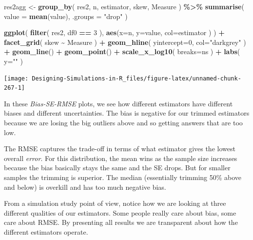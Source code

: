 \documentclass[
]{book}
\newenvironment{Shaded}{\begin{snugshade}}{\end{snugshade}}
\newcommand{\AttributeTok}[1]{\textcolor[rgb]{0.13,0.29,0.53}{#1}}
\newcommand{\DecValTok}[1]{\textcolor[rgb]{0.00,0.00,0.81}{#1}}
\newcommand{\FunctionTok}[1]{\textcolor[rgb]{0.13,0.29,0.53}{\textbf{#1}}}
\newcommand{\NormalTok}[1]{#1}
\newcommand{\OtherTok}[1]{\textcolor[rgb]{0.56,0.35,0.01}{#1}}
\newcommand{\SpecialCharTok}[1]{\textcolor[rgb]{0.81,0.36,0.00}{\textbf{#1}}}
\newcommand{\StringTok}[1]{\textcolor[rgb]{0.31,0.60,0.02}{#1}}
\begin{document}
\begin{Shaded}
\begin{Highlighting}[]
\NormalTok{res2agg }\OtherTok{\textless{}{-}} \FunctionTok{group\_by}\NormalTok{( res2, n, estimator, skew, Measure ) }\SpecialCharTok{\%\textgreater{}\%}
  \FunctionTok{summarise}\NormalTok{( }\AttributeTok{value =} \FunctionTok{mean}\NormalTok{(value), }\AttributeTok{.groups =} \StringTok{"drop"}\NormalTok{ )}

\FunctionTok{ggplot}\NormalTok{( }\FunctionTok{filter}\NormalTok{( res2, df0 }\SpecialCharTok{==} \DecValTok{3}\NormalTok{ ), }\FunctionTok{aes}\NormalTok{(}\AttributeTok{x=}\NormalTok{n, }\AttributeTok{y=}\NormalTok{value, }\AttributeTok{col=}\NormalTok{estimator ) ) }\SpecialCharTok{+}
    \FunctionTok{facet\_grid}\NormalTok{( skew }\SpecialCharTok{\textasciitilde{}}\NormalTok{ Measure ) }\SpecialCharTok{+}
    \FunctionTok{geom\_hline}\NormalTok{( }\AttributeTok{yintercept=}\DecValTok{0}\NormalTok{, }\AttributeTok{col=}\StringTok{"darkgrey"}\NormalTok{ ) }\SpecialCharTok{+}
    \FunctionTok{geom\_line}\NormalTok{() }\SpecialCharTok{+} \FunctionTok{geom\_point}\NormalTok{() }\SpecialCharTok{+}
    \FunctionTok{scale\_x\_log10}\NormalTok{( }\AttributeTok{breaks=}\NormalTok{ns ) }\SpecialCharTok{+}
    \FunctionTok{labs}\NormalTok{( }\AttributeTok{y=}\StringTok{""}\NormalTok{ )}
\end{Highlighting}
\end{Shaded}

\begin{center}\texttt{[image: Designing-Simulations-in-R\_files/figure-latex/unnamed-chunk-267-1]} \end{center}

In these \emph{Bias-SE-RMSE} plots, we see how different estimators have different biases and different
uncertainties.
The bias is negative for our trimmed estimators because we
are losing the big outliers above and so getting answers that are too low.

The RMSE captures the trade-off in terms of what estimator gives the lowest
overall \emph{error}. For this distribution, the mean wins as the sample size
increases because the bias basically stays the same and the SE drops. But
for smaller samples the trimming is superior. The median (essentially
trimming 50\% above and below) is overkill and has too much negative bias.

From a simulation study point of view, notice how we are looking at three
different qualities of our estimators. Some people really care about bias,
some care about RMSE. By presenting all results we are transparent about how
the different estimators operate.
\end{document}
